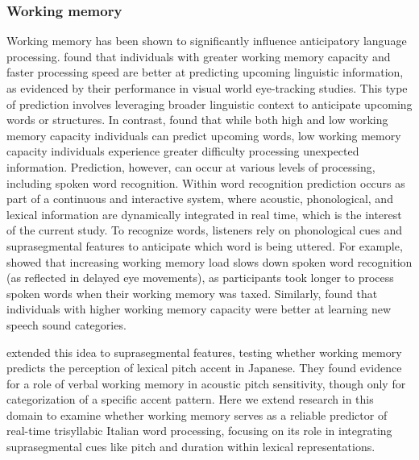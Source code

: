 \subsubsection{Working memory}
Working memory has been shown to significantly influence anticipatory language processing. \cite{Huettig2016} found that individuals with greater working memory capacity and faster processing speed are better at predicting upcoming linguistic information, as evidenced by their performance in visual world eye-tracking studies. This type of prediction involves leveraging broader linguistic context to anticipate upcoming words or structures. In contrast, \cite{otten2009} found that while both high and low working memory capacity individuals can predict upcoming words, low working memory capacity individuals experience greater difficulty processing unexpected information. Prediction, however, can occur at various levels of processing, including spoken word recognition. Within word recognition prediction occurs as part of a continuous and interactive system, where acoustic, phonological, and lexical information are dynamically integrated in real time, which is the interest of the current study. To recognize words, listeners rely on phonological cues and suprasegmental features to anticipate which word is being uttered. For example, \cite{hadar_2016} showed that increasing working memory load slows down spoken word recognition (as reflected in delayed eye movements), as participants took longer to process spoken words when their working memory was taxed. Similarly, \cite{mchaney_et_al_2021_workingmemory} found that individuals with higher working memory capacity were better at learning new speech sound categories.

\cite{goss_2014} extended this idea to suprasegmental features, testing whether working memory predicts the perception of lexical pitch accent in Japanese. They found evidence for a role of verbal working memory in acoustic pitch sensitivity, though only for categorization of a specific accent pattern. Here we extend research in this domain to examine whether working memory serves as a reliable predictor of real-time trisyllabic Italian word processing, focusing on its role in integrating suprasegmental cues like pitch and duration within lexical representations.


